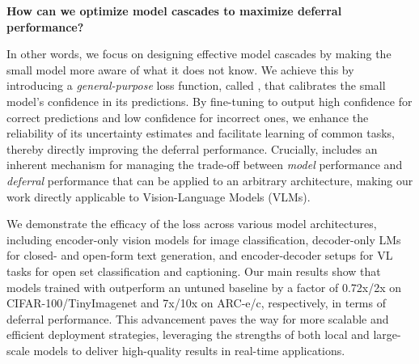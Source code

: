 \begin{center}
\textbf{How can we optimize model cascades to maximize deferral performance?} 
\end{center}


In other words, we focus on designing effective model cascades by making the small model more aware of what it does not know. We achieve this by introducing a \textit{general-purpose} loss function, called \loss, that calibrates the small model’s confidence in its predictions. By fine-tuning \textbf{\smallmodel} to output high confidence for correct predictions and low confidence for incorrect ones, we enhance the reliability of its uncertainty estimates and facilitate learning of common tasks, thereby directly improving the deferral performance.  Crucially, \loss includes an inherent mechanism for managing the trade-off between \emph{model} performance and \emph{deferral} performance that can be applied to an arbitrary architecture, making our work directly applicable to Vision-Language Models (VLMs). 

We demonstrate the efficacy of the \loss loss across various model architectures, including encoder-only vision models for image classification, decoder-only LMs for closed- and open-form text generation, and encoder-decoder setups for VL tasks for open set classification and captioning. Our main results show that models trained with \loss outperform an untuned baseline by a factor of 0.72x/2x on CIFAR-100/TinyImagenet and 7x/10x on ARC-e/c, respectively, in terms of deferral performance. This advancement paves the way for more scalable and efficient deployment strategies, leveraging the strengths of both local and large-scale models to deliver high-quality results in real-time applications.
